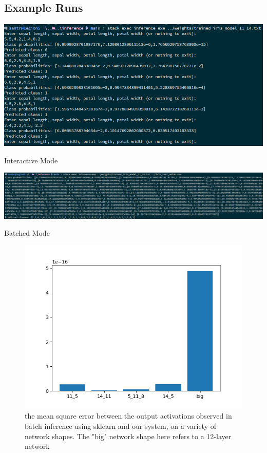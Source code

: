 \documentclass[12pt, titlepage]{article}
\begin{document}
\subsection{Example Runs}
{
	\begin{center}
		\includegraphics[width=\textwidth]{../images/examples.png}
	\end{center}
	\begin{center}
		Interactive Mode
	\end{center}
	\begin{center}
		\includegraphics[width=\textwidth]{../images/examplebatch.png}
	\end{center}
	\begin{center}
		Batched Mode
	\end{center}
}

\begin{figure}[H]
	\includegraphics[width=\textwidth]{../images/mse.png}
	\caption{\centering \label{fig:3}the mean square error between the output activations observed in batch inference using sklearn and our system, on a variety of network shapes. The "big" network shape here refers to a 12-layer network}
\end{figure}
\end{document}
